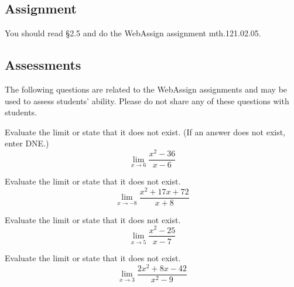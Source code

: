 \documentclass[12pt,addpoints, answers, fleqn]{exam}
\begin{document}
\subsection{Assignment}
You should read \S  2.5 and do the WebAssign assignment mth.121.02.05.
\vfill
\pagebreak

\begin{teacher}
\subsection{Assessments}
The following questions are related to the WebAssign assignments and may be used to assess students' ability. Please do not share any of these questions with students.
\begin{questions}	
\question 	%

Evaluate the limit or state that it does not exist. (If an answer does not exist, enter DNE.)
\[
\lim_{x \to 6} \frac{x^2 - 36}{x - 6}
\]


\begin{solution}
\end{solution}

\question 	%

Evaluate the limit or state that it does not exist.
\[
\lim_{x \to -8} \frac{x^2+17x+72}{x +8 }
\]



\begin{solution}
\end{solution}

\question 	%

Evaluate the limit or state that it does not exist.
\[
\lim_{x \to 5} \frac{x^2-25}{x -7 }
\]


\begin{solution}
\end{solution}

\question 	%

Evaluate the limit or state that it does not exist.
\[
\lim_{x \to 3} \frac{2x^2+8x-42}{x^2-9 }
\]


\begin{solution}
\end{solution}

\question 	%


\end{questions}
\end{teacher}
\end{document}
